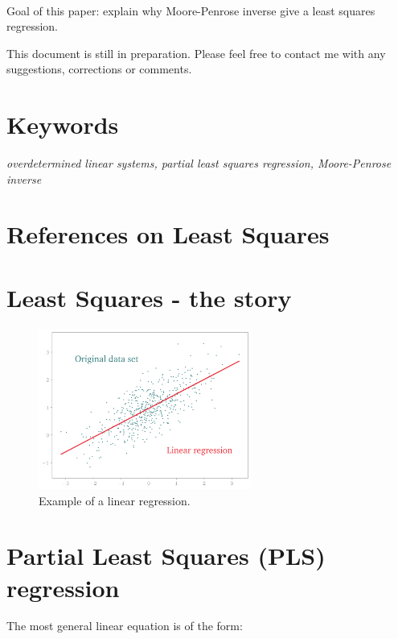 \documentclass[10pt,twocolumn]{article}
\begin{document}
\,\,

Goal of this paper: explain why Moore-Penrose inverse give a least squares regression.
\,\,

This document is still in preparation. Please feel free to contact me with any suggestions, corrections or comments.

\section*{Keywords}

\textit{overdetermined linear systems, partial least squares regression, Moore-Penrose inverse}

\tableofcontents


\section{References on Least Squares}






\section{Least Squares - the story}





\begin{figure}[H]
\centering\includegraphics[width=7cm]{linear-regression.png}
\caption{Example of a linear regression.}
\label{fig:linear-regression-demo}
\end{figure}




\section{Partial Least Squares (PLS) regression}

The most general linear equation is of the form:
\end{document}
